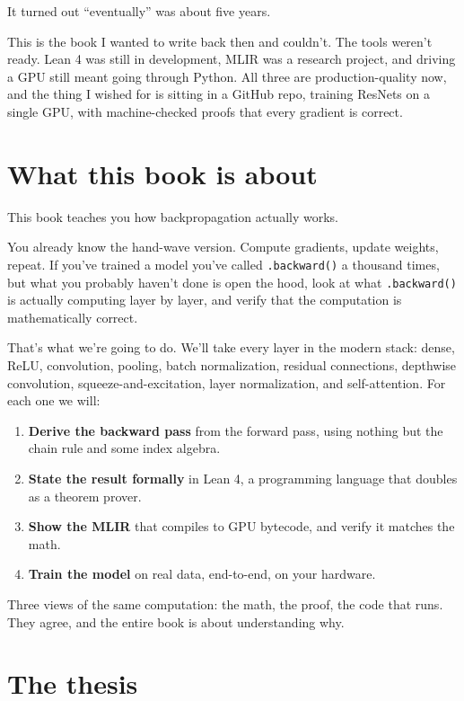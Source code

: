 It turned out ``eventually'' was about five years.

This is the book I wanted to write back then and couldn't. The tools
weren't ready. Lean 4 was still in development, MLIR was a research
project, and driving a GPU still meant going through Python. All three
are production-quality now, and the thing I wished for is sitting in a
GitHub repo, training ResNets on a single GPU, with machine-checked proofs that
every gradient is correct.

\section*{What this book is about}

This book teaches you how backpropagation actually works.

You already know the hand-wave version. Compute gradients, update
weights, repeat. If you've trained a model you've called
\texttt{.backward()} a thousand times, but what you probably haven't done
is open the hood, look at what \texttt{.backward()} is actually
computing layer by layer, and verify that the computation is
mathematically correct.

That's what we're going to do. We'll take every layer in the modern
stack: dense, ReLU, convolution, pooling, batch normalization, residual
connections, depthwise convolution, squeeze-and-excitation, layer
normalization, and self-attention. For each one we will:

\begin{enumerate}
  \item \textbf{Derive the backward pass} from the forward pass, using nothing
    but the chain rule and some index algebra.
  \item \textbf{State the result formally} in Lean 4, a programming language
    that doubles as a theorem prover.
  \item \textbf{Show the MLIR} that compiles to GPU bytecode, and verify it
    matches the math.
  \item \textbf{Train the model} on real data, end-to-end, on your hardware.
\end{enumerate}

Three views of the same computation: the math, the proof, the code that
runs. They agree, and the entire book is about understanding why.

\section*{The thesis}

